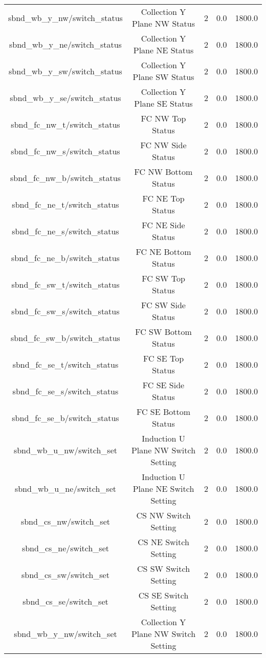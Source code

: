 \begin{center}
\begin{longtable}{c | c c c c }
sbnd\_wb\_y\_nw/switch\_status & Collection Y Plane NW Status & 2 & 0.0 & 1800.0\\ 
sbnd\_wb\_y\_ne/switch\_status & Collection Y Plane NE Status & 2 & 0.0 & 1800.0\\ 
sbnd\_wb\_y\_sw/switch\_status & Collection Y Plane SW Status & 2 & 0.0 & 1800.0\\ 
sbnd\_wb\_y\_se/switch\_status & Collection Y Plane SE Status & 2 & 0.0 & 1800.0\\ 
sbnd\_fc\_nw\_t/switch\_status & FC NW Top Status & 2 & 0.0 & 1800.0\\ 
sbnd\_fc\_nw\_s/switch\_status & FC NW Side Status & 2 & 0.0 & 1800.0\\ 
sbnd\_fc\_nw\_b/switch\_status & FC NW Bottom Status & 2 & 0.0 & 1800.0\\ 
sbnd\_fc\_ne\_t/switch\_status & FC NE Top Status & 2 & 0.0 & 1800.0\\ 
sbnd\_fc\_ne\_s/switch\_status & FC NE Side Status & 2 & 0.0 & 1800.0\\ 
sbnd\_fc\_ne\_b/switch\_status & FC NE Bottom Status & 2 & 0.0 & 1800.0\\ 
sbnd\_fc\_sw\_t/switch\_status & FC SW Top Status & 2 & 0.0 & 1800.0\\ 
sbnd\_fc\_sw\_s/switch\_status & FC SW Side Status & 2 & 0.0 & 1800.0\\ 
sbnd\_fc\_sw\_b/switch\_status & FC SW Bottom Status & 2 & 0.0 & 1800.0\\ 
sbnd\_fc\_se\_t/switch\_status & FC SE Top Status & 2 & 0.0 & 1800.0\\ 
sbnd\_fc\_se\_s/switch\_status & FC SE Side Status & 2 & 0.0 & 1800.0\\ 
sbnd\_fc\_se\_b/switch\_status & FC SE Bottom Status & 2 & 0.0 & 1800.0\\ 
sbnd\_wb\_u\_nw/switch\_set & Induction U Plane NW Switch Setting & 2 & 0.0 & 1800.0\\ 
sbnd\_wb\_u\_ne/switch\_set & Induction U Plane NE Switch Setting & 2 & 0.0 & 1800.0\\ 
sbnd\_cs\_nw/switch\_set & CS NW Switch Setting & 2 & 0.0 & 1800.0\\ 
sbnd\_cs\_ne/switch\_set & CS NE Switch Setting & 2 & 0.0 & 1800.0\\ 
sbnd\_cs\_sw/switch\_set & CS SW Switch Setting & 2 & 0.0 & 1800.0\\ 
sbnd\_cs\_se/switch\_set & CS SE Switch Setting & 2 & 0.0 & 1800.0\\ 
sbnd\_wb\_y\_nw/switch\_set & Collection Y Plane NW Switch Setting & 2 & 0.0 & 1800.0\\ 

\end{longtable}
\end{center}
